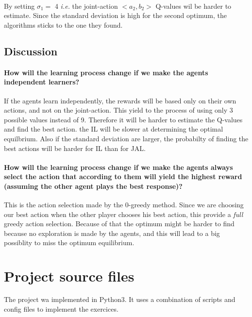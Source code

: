 \documentclass[letterpaper]{article}
\begin{document}
\paragraph{}

By setting $\sigma_1 =$ 4 \textit{i.e.} the joint-action $<a_2, b_2>$
Q-values wil be harder to estimate. Since the standard deviation is high
for the second optimum, the algorithms sticks to the one they found.



\subsection{Discussion}

\paragraph{How will the learning process change
if we make the agents independent learners?}

If the agents learn independently, the rewards will be based only on their
own actions, and not on the joint-action. This yield to the process of
using only 3 possible values instead of 9. Therefore it will be harder
to estimate the Q-values and find the best action. the IL
will be slower at determining  the
optimal equilbrium. Also if the standard deviation are larger, the probabilty
of finding the best actions will be harder for IL than for JAL.

\paragraph{How will the learning process change if we make
the agents always select the action that according
to them will yield the highest reward (assuming the
other agent plays the best response)?}


This is the action selection made by the 0-greedy method. Since we are choosing
our best action when the other player chooses his best action, this provide
a \textit{full} greedy action selection. Because of that the optimum might
be harder to find because no exploration is made by the agents, and this
will lead to a big possiblity to miss the
optimum equilibrium.

\section{Project source files}

The project wa implemented in Python3. It uses a combination of
scripts and config files to implement the exercices.
\end{document}
